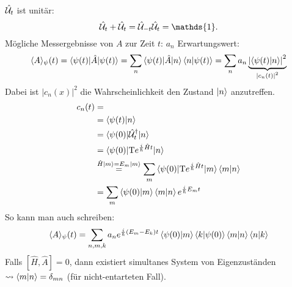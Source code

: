 		$\hat{\mathcal{U}}_t$ ist unitär: 		
			\begin{equation*}
				\hat{\U}_t + \hat{\U}_t = \hat{\U}_{-t} \hat{\U}_t = \mathds{1}.
			\end{equation*}
		Mögliche Messergebnisse von $A$ zur Zeit $t$: $a_n$
		Erwartungswert:	
			\begin{align*}
				\langle {A} \rangle_\psi (t) = \braket{\psi(t) | \hat{A} | \psi(t)} = \sum_n \braket{\psi(t) | \hat{A} | n} \braket{n | \psi(t)} = \sum_n a_n 
				\underbrace{\left| \braket{\psi(t) | n} \right|^2}_{\substack{|c_n(t)|^2}}				
			\end{align*}
		Dabei ist $|c_n(x)|^2$ die Wahrscheinlichkeit den Zustand $\ket{n}$ anzutreffen.
			\begin{align*}
				c_n(t) &= \\
				&= \braket{\psi(t) | n} \\
				&= \braket{\psi(0) | \hat{\mathcal{U}}_t^\dagger | n} \\
				&= \braket{\psi(0) | \text{T} e^{\frac{i}{\hbar} \hat{H} t} | n} \\
				& \overset{\hat{H}\ket{m} = E_m \ket{m}}{=} 
				\sum_m \braket{\psi(0) | \text{T} e^{ \frac{i}{\hbar} \hat{H} t} | m} \braket{m | n} \\
				&= \sum_m \braket{\psi(0) | m} \braket{m | n} e^{ \frac{i}{\hbar} E_m t}
			\end{align*}
		So kann man auch schreiben:
			\begin{equation*}
				\langle {A} \rangle_\psi (t) =
				\sum_{n,m,k} a_n e^{ \frac{i}{\hbar} (E_m - E_k) t} 
				\braket{\psi(0) | m} \braket{k | \psi(0)} \braket{m | n} \braket{n | k}
			\end{equation*}
		Falls $[\hat{H} , \hat{A}] = 0$, dann existiert simultanes System von Eigenzuständen $\leadsto \braket{m | n} = \delta_{mn}$ (für nicht-entarteten Fall).
